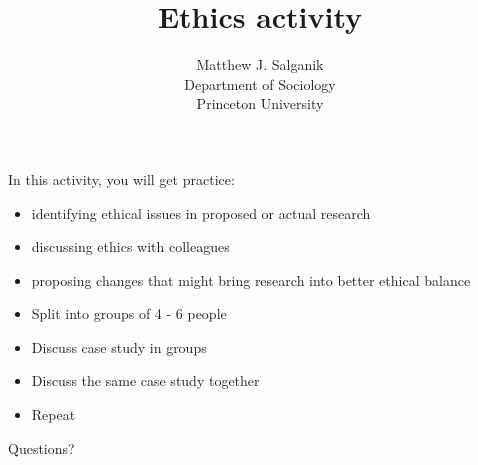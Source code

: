 \documentclass{beamer}
\title[]{Ethics activity}
\author[]{Matthew J. Salganik\\Department of Sociology\\Princeton University}
\date[]{Summer Institute in Computational Social Science\\June 18, 2018
\vfill
\begin{flushright}
\vfill
\texttt{[image: figures/cc-by.png]}
\end{flushright}
}
\begin{document}
\frame{\titlepage}
\begin{frame}

In this activity, you will get practice:
\begin{itemize}
\item identifying ethical issues in proposed or actual research
\pause
\item discussing ethics with colleagues
\pause
\item proposing changes that might bring research into better ethical balance
\end{itemize}

\end{frame}
\begin{frame}

\begin{itemize}
\item Split into groups of 4 - 6 people
\pause
\item Discuss case study in groups
\pause
\item Discuss the same case study together
\pause
\item Repeat
\end{itemize}

\end{frame}
\begin{frame}

\begin{center}
\LARGE
Questions?
\end{center}

\end{frame}
\end{document}
